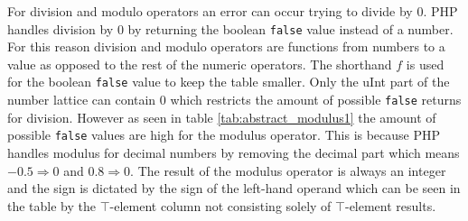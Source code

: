 \begin{table}[htbp]
\centering
{}
\caption{Abstract Subtraction}
\label{tab:abstract_subtraction1}
\end{table}


For division and modulo operators an error can occur trying to divide by 0. PHP handles division by 0 by returning the boolean \texttt{false} value instead of a number. For this reason division and modulo operators are functions from numbers to a value as opposed to the rest of the numeric operators. The shorthand $f$ is used for the boolean \texttt{false} value to keep the table smaller. Only the uInt part of the number lattice can contain 0 which restricts the amount of possible \texttt{false} returns for division. However as seen in table \ref{tab:abstract_modulus1} the amount of possible \texttt{false} values are high for the modulus operator. This is because PHP handles modulus for decimal numbers by removing the decimal part which means $-0.5 \Rightarrow 0$ and $0.8 \Rightarrow 0$. The result of the modulus operator is always an integer and the sign is dictated by the sign of the left-hand operand which can be seen in the table by the $\top$-element column not consisting solely of $\top$-element results.


